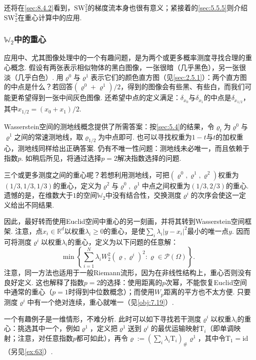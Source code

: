 还将在\autoref{sec:8.4.2}看到，$\mathrm{SW}_2^2$的梯度流本身也很有意义；紧接着的\autoref{sec:5.5.5}则介绍$\mathrm{SW}_2^2$在重心计算中的应用.

\subsubsection[二阶Wasserstein空间中的重心]{$\mathbb W_2$中的重心}\label{sec:5.5.5}

应用中、尤其图像处理中的一个有趣问题，是为两个或更多概率测度寻找合理的重心概念. 假设有两张表示相似物体的黑白图像，一张很暗（几乎黑色），另一张很淡（几乎白色）. 用$\varrho^0$与$\varrho^1$表示它们的颜色直方图（见\autoref{sec:2.5.1}）：两个直方图的中点是什么？若回答$(\varrho^0+\varrho^1)/2$，得到的图像会有些黑、有些白，而我们可能更希望得到一张中间灰色图像. 还希望中点的定义满足：$\delta_{x_0}$与$\delta_{x_1}$的中点是$\delta_{x_{1/2}}$，其中$x_{1/2}=(x_0+x_1)/2$.

Wasserstein空间的测地线概念提供了所需答案：按\autoref{sec:5.4}的结果，令$\varrho_t$为$\varrho^0$与$\varrho^1$之间的常速测地线，取$\varrho_{1/2}$为中点即可. 也可以寻找权重为$1-t$与$t$的加权重心，测地线同样给出正确答案. 仍有不唯一性问题：测地线未必唯一，而且依赖于指数$p$. 如稍后所见，将通过选择$p=2$解决指数选择的问题.

三个或更多测度之间的重心呢？若想利用测地线，可把$(\varrho^0,\allowbreak\varrho^1,\allowbreak\varrho^2)$权重为$(1/3,\allowbreak1/3,\allowbreak1/3)$的重心，定义为$\varrho^2$与$\varrho^0,\varrho^1$中点之间权重为$(1/3,2/3)$的重心. 遗憾的是，在维数大于$1$的空间$\mathbb W_2$中没有结合性，交换测度$\varrho^i$的次序会使这一定义给出不同结果.

因此，最好转而使用Euclid空间中重心的另一刻画，并将其转到Wasserstein空间框架. 注意，点$x_i\in\mathbb R^d$以权重$\lambda_i\ge0$的重心，是使$\sum_i\lambda_i|y-x_i|^2$最小的唯一点$y$. 因而可将测度$\varrho^i$以权重$\lambda_i$的重心，定义为以下问题的任意解：
\begin{equation}\label{eq:5.7}
\min\left\{\sum_{i=1}^N\lambda_iW_2^2(\varrho,\varrho^i)^2:\varrho\in\mathscr P(\Omega)\right\}.
\end{equation}
注意，同一方法也适用于一般Riemann流形，因为在非线性结构上，重心否则没有良好定义. 这也解释了指数$p=2$的选择：使用距离的$p$次幂，不能恢复Euclid空间中通常的重心（$p=1$时得到中位数概念）；而使用$W_p$距离的平方也不太方便. 只要测度$\varrho^i$中有一个绝对连续，重心就唯一（见\autoref{obj:7.19}）.

一个有趣例子是一维情形，不难分析. 此时可以如下寻找若干测度$\varrho^i$以权重$\lambda_i$的重心：挑选其中一个，例如$\varrho^1$，定义把$\varrho^1$送到$\varrho^i$的最优运输映射$\mathrm T_i$（即单调映射；注意，对任意指数$p$都可如此），再令$\varrho:=(\sum_i\lambda_i\mathrm T_i)_\#\varrho^1$，其中令$\mathrm T_1=\mathrm{id}$（另见\autoref{ex:63}）.

